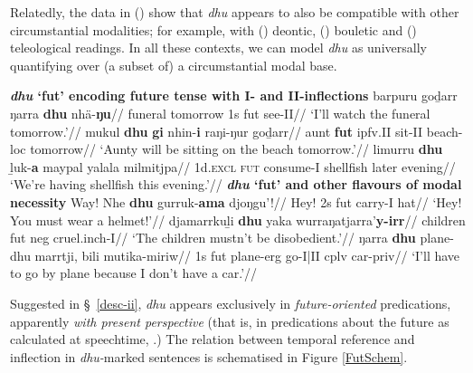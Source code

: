 Relatedly, the data in () show that \textit{dhu} appears to also be compatible with other circumstantial modalities; for example, with () deontic, () bouletic and () teleological readings. In all these contexts, we can model \textit{dhu} as universally quantifying over (a subset of) a circumstantial modal base.

\pex \textbf{\textit{dhu} `\gls{fut}' encoding future tense with \gls{I}- and \gls{II}-inflections}
\a\begingl\gla barpuru goḏarr ŋarra \textbf{dhu} nhä-\textbf{ŋu}//
\glb funeral tomorrow 1s \gls{fut} see-\gls{II}//
\glft`I'll watch the funeral tomorrow.'\trailingcitation{}//
\endgl
\a\begingl\gla mukul \textbf{dhu} \textbf{gi} nhin-\textbf{i} raŋi-ŋur goḏarr//
\glb aunt \textbf{\gls{fut}} \gls{ipfv}.\gls{II} sit-\gls{II} beach-\gls{loc} tomorrow//
\glft`Aunty will be sitting on the beach tomorrow.'\trailingcitation{[AW~20190409]}//\endgl
\a\begingl\gla limurru \textbf{dhu} ḻuk-\textbf{a} maypal yalala milmitjpa//
\glb 1d.\textsc{excl} \textsc{fut} consume-\gls{I} shellfish later evening//
\glft `We're having shellfish this evening.'\trailingcitation{[DhG~20190417]}//
\endgl
\xe
\pex \textbf{\textit{dhu} `\gls{fut}' and other flavours of modal necessity}
\a\begingl\gla Way! Nhe \textbf{dhu} gurruk-\textbf{ama} djoŋgu'!//
\glb Hey! 2s \gls{fut} carry-\gls{I} hat//
\glft`Hey! You must wear a helmet!'\trailingcitation{[DhG~20190405]}//\endgl
\a\begingl\gla djamarrkuḻi \textbf{dhu} yaka wurraŋatjarra'\textbf{y-irr}//
\glb children \gls{fut} \gls{neg} cruel.\gls{inch}-\gls{I}//
\glft`The children mustn't be disobedient.'\trailingcitation{[AW~20190429]}//\endgl
\a\begingl\gla ŋarra \textbf{dhu} plane-dhu marrtji, bili mutika-miriw//
\glb 1s \gls{fut} plane-\gls{erg} go-\gls{I}|\gls{II} \gls{cplv} car-\gls{priv}//
\glft`I'll have to go by plane because I don't have a car.'\trailingcitation{[AW~20190429]}//\endgl
\xe

\noindent Suggested in \S~\ref{desc-ii}, \textit{dhu} appears exclusively in \textit{future-oriented} predications, apparently \textit{with present perspective} (that is, in predications about the future as calculated at speechtime, \citealp[see][]{Condoravdi2002}.) The relation between temporal reference and inflection in \textit{dhu-}marked sentences is schematised in Figure \ref{FutSchem}.

